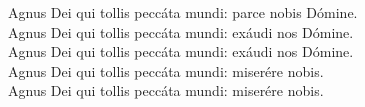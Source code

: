 {	Agnus Dei qui tollis peccáta mundi: parce nobis Dómine. \\
	Agnus Dei qui tollis peccáta mundi: exáudi nos Dómine. \R \\
	Agnus Dei qui tollis peccáta mundi: exáudi nos Dómine. \\
	Agnus Dei qui tollis peccáta mundi: miserére nobis. \R \\
	Agnus Dei qui tollis peccáta mundi: miserére nobis.
}


